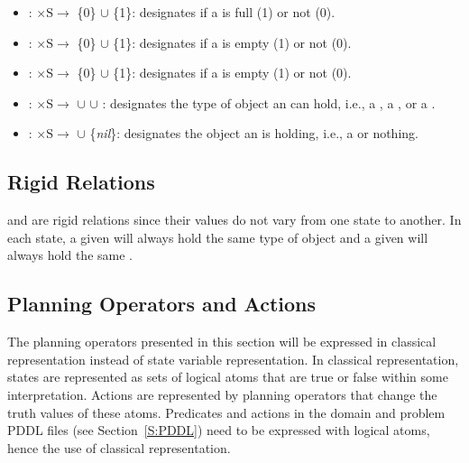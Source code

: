 \begin{itemize}
\item {}: $\mathrm{\times S\rightarrow}$ \{0\} $\cup$ \{1\}: designates if a  is full (1) or not (0).

\item {}: $\mathrm{\times S\rightarrow}$ \{0\} $\cup$ \{1\}: designates if a  is empty (1) or not (0).

\item {}: $\mathrm{\times S\rightarrow}$ \{0\} $\cup$ \{1\}: designates if a  is empty (1) or not (0).

\item {}: $\mathrm{\times S \rightarrow}$ $\cup$  $\cup$ : designates the type of object an  can hold, i.e., a , a , or a .

\item {}: $\mathrm{\times S \rightarrow}$ $\cup$ \{\textit{nil}\}: designates the object an  is holding, i.e., a  or nothing.
\end{itemize}


\subsection{Rigid Relations}
\label{subsubsect:Rigid_Relation}
 and  are rigid relations since their values do not vary from one state to another. In each state, a given  will always hold the same type of object and a given  will always hold the same .

\subsection{Planning Operators and Actions}
\label{subsect:Planning_Operators}
The planning operators presented in this section will be expressed in classical representation instead of state variable representation. In classical representation, states are represented as sets of logical atoms that are true or false within some interpretation. Actions are represented by planning operators that change the truth values of these atoms. Predicates and actions in the domain and problem PDDL files (see Section~\ref{S:PDDL}) need to be expressed with logical atoms, hence the use of classical representation.

